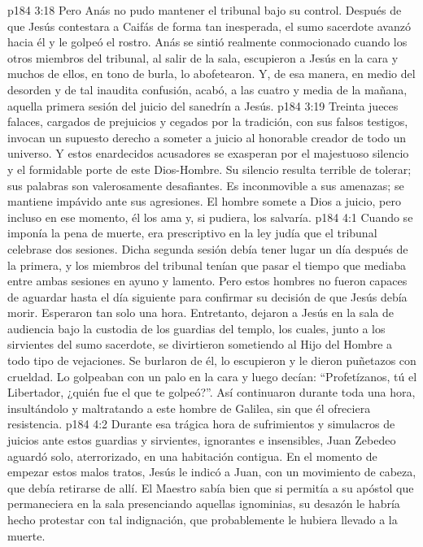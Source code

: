 \vs p184 3:18 Pero Anás no pudo mantener el tribunal bajo su control. Después de que Jesús contestara a Caifás de forma tan inesperada, el sumo sacerdote avanzó hacia él y le golpeó el rostro. Anás se sintió realmente conmocionado cuando los otros miembros del tribunal, al salir de la sala, escupieron a Jesús en la cara y muchos de ellos, en tono de burla, lo abofetearon. Y, de esa manera, en medio del desorden y de tal inaudita confusión, acabó, a las cuatro y media de la mañana, aquella primera sesión del juicio del sanedrín a Jesús.
\vs p184 3:19 \pc Treinta jueces falaces, cargados de prejuicios y cegados por la tradición, con sus falsos testigos, invocan un supuesto derecho a someter a juicio al honorable creador de todo un universo. Y estos enardecidos acusadores se exasperan por el majestuoso silencio y el formidable porte de este Dios\hyp{}Hombre. Su silencio resulta terrible de tolerar; sus palabras son valerosamente desafiantes. Es inconmovible a sus amenazas; se mantiene impávido ante sus agresiones. El hombre somete a Dios a juicio, pero incluso en ese momento, él los ama y, si pudiera, los salvaría.
\vs p184 4:1 Cuando se imponía la pena de muerte, era prescriptivo en la ley judía que el tribunal celebrase dos sesiones. Dicha segunda sesión debía tener lugar un día después de la primera, y los miembros del tribunal tenían que pasar el tiempo que mediaba entre ambas sesiones en ayuno y lamento. Pero estos hombres no fueron capaces de aguardar hasta el día siguiente para confirmar su decisión de que Jesús debía morir. Esperaron tan solo una hora. Entretanto, dejaron a Jesús en la sala de audiencia bajo la custodia de los guardias del templo, los cuales, junto a los sirvientes del sumo sacerdote, se divirtieron sometiendo al Hijo del Hombre a todo tipo de vejaciones. Se burlaron de él, lo escupieron y le dieron puñetazos con crueldad. Lo golpeaban con un palo en la cara y luego decían: “Profetízanos, tú el Libertador, ¿quién fue el que te golpeó?”. Así continuaron durante toda una hora, insultándolo y maltratando a este hombre de Galilea, sin que él ofreciera resistencia.
\vs p184 4:2 Durante esa trágica hora de sufrimientos y simulacros de juicios ante estos guardias y sirvientes, ignorantes e insensibles, Juan Zebedeo aguardó solo, aterrorizado, en una habitación contigua. En el momento de empezar estos malos tratos, Jesús le indicó a Juan, con un movimiento de cabeza, que debía retirarse de allí. El Maestro sabía bien que si permitía a su apóstol que permaneciera en la sala presenciando aquellas ignominias, su desazón le habría hecho protestar con tal indignación, que probablemente le hubiera llevado a la muerte.
